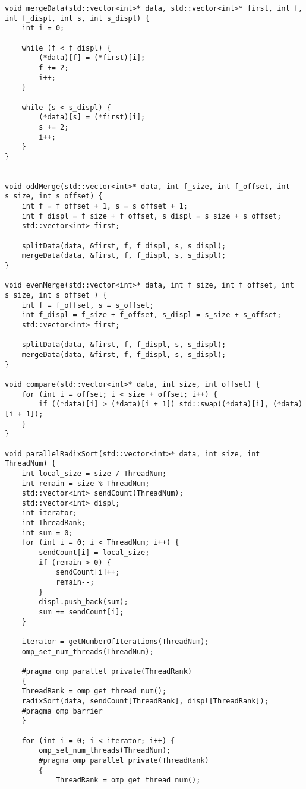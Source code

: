 \documentclass{report}
\begin{document}
\begin{lstlisting}
void mergeData(std::vector<int>* data, std::vector<int>* first, int f, int f_displ, int s, int s_displ) {
    int i = 0;

    while (f < f_displ) {
        (*data)[f] = (*first)[i];
        f += 2;
        i++;
    }

    while (s < s_displ) {
        (*data)[s] = (*first)[i];
        s += 2;
        i++;
    }
}


void oddMerge(std::vector<int>* data, int f_size, int f_offset, int s_size, int s_offset) {
    int f = f_offset + 1, s = s_offset + 1;
    int f_displ = f_size + f_offset, s_displ = s_size + s_offset;
    std::vector<int> first;

    splitData(data, &first, f, f_displ, s, s_displ);
    mergeData(data, &first, f, f_displ, s, s_displ);
}

void evenMerge(std::vector<int>* data, int f_size, int f_offset, int s_size, int s_offset ) {
    int f = f_offset, s = s_offset;
    int f_displ = f_size + f_offset, s_displ = s_size + s_offset;
    std::vector<int> first;

    splitData(data, &first, f, f_displ, s, s_displ);
    mergeData(data, &first, f, f_displ, s, s_displ);
}

void compare(std::vector<int>* data, int size, int offset) {
    for (int i = offset; i < size + offset; i++) {
        if ((*data)[i] > (*data)[i + 1]) std::swap((*data)[i], (*data)[i + 1]);
    }
}

void parallelRadixSort(std::vector<int>* data, int size, int ThreadNum) {
    int local_size = size / ThreadNum;
    int remain = size % ThreadNum;
    std::vector<int> sendCount(ThreadNum);
    std::vector<int> displ;
    int iterator;
    int ThreadRank;
    int sum = 0;
    for (int i = 0; i < ThreadNum; i++) {
        sendCount[i] = local_size;
        if (remain > 0) {
            sendCount[i]++;
            remain--;
        }
        displ.push_back(sum);
        sum += sendCount[i];
    }

    iterator = getNumberOfIterations(ThreadNum);
    omp_set_num_threads(ThreadNum);

    #pragma omp parallel private(ThreadRank)
    {
    ThreadRank = omp_get_thread_num();
    radixSort(data, sendCount[ThreadRank], displ[ThreadRank]);
    #pragma omp barrier
    }

    for (int i = 0; i < iterator; i++) {
        omp_set_num_threads(ThreadNum);
        #pragma omp parallel private(ThreadRank)
        {
            ThreadRank = omp_get_thread_num();


\end{lstlisting}
\end{document}
